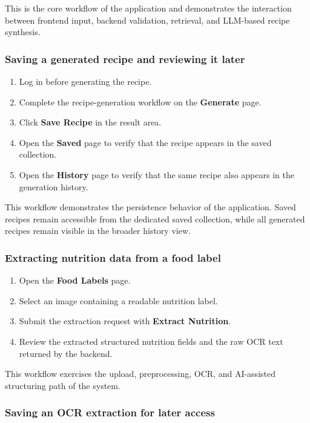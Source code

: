 This is the core workflow of the application and demonstrates the
interaction between frontend input, backend validation, retrieval, and
LLM-based recipe synthesis.

\subsubsection{Saving a generated recipe and reviewing it later}

\begin{enumerate}
	\item Log in before generating the recipe.
	\item Complete the recipe-generation workflow on the
	\textbf{Generate} page.
	\item Click \textbf{Save Recipe} in the result area.
	\item Open the \textbf{Saved} page to verify that the recipe appears
	in the saved collection.
	\item Open the \textbf{History} page to verify that the same recipe
	also appears in the generation history.
\end{enumerate}

This workflow demonstrates the persistence behavior of the
application. Saved recipes remain accessible from the dedicated saved
collection, while all generated recipes remain visible in the broader
history view.

\subsubsection{Extracting nutrition data from a food label}

\begin{enumerate}
	\item Open the \textbf{Food Labels} page.
	\item Select an image containing a readable nutrition label.
	\item Submit the extraction request with
	\textbf{Extract Nutrition}.
	\item Review the extracted structured nutrition fields and the raw
	OCR text returned by the backend.
\end{enumerate}

This workflow exercises the upload, preprocessing, OCR, and
AI-assisted structuring path of the system.

\subsubsection{Saving an OCR extraction for later access}

